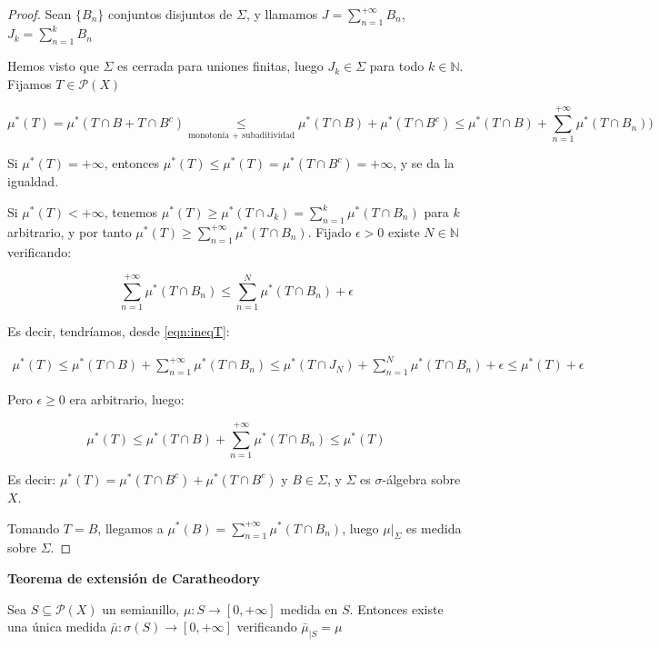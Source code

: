 \begin{proof}
 Sean $\{B_n\}$ conjuntos disjuntos de $\Sigma$, y llamamos $J = \sum_{n=1}^{+\infty} B_n$, $J_k = \sum_{n=1}^{k} B_n$
 
 Hemos visto que $\Sigma$ es cerrada para uniones finitas, luego $J_k \in \Sigma$ para todo $k\in \mathbb{N}$.
 Fijamos $T\in \mathcal{P}(X)$
 
 \begin{equation}
  \mu^\ast(T) = \mu^\ast(T\cap B + T\cap B^c) \underset{\textrm{monotonía + subaditividad}} \le 
  \mu^\ast(T\cap B) + \mu^\ast(T\cap B^c) \le \mu^\ast(T\cap B) + \sum_{n=1}^{+\infty}\mu^\ast(T\cap B_n))
  \label{eqn:ineqT} \tag{*}
 \end{equation}
 
 Si $\mu^\ast(T) = +\infty$, entonces $\mu^\ast(T) \le \mu^\ast(T) = \mu^\ast(T\cap B^c) = +\infty$, y se da
 la igualdad.
 
 Si $\mu^\ast(T) < +\infty$, tenemos $\mu^\ast(T) \ge \mu^\ast(T\cap J_k) = \sum_{n=1}^k \mu^\ast(T\cap B_n)$
 para $k$ arbitrario, y por tanto $\mu^\ast(T) \ge \sum_{n=1}^{+\infty} \mu^\ast(T\cap B_n)$. Fijado $\epsilon > 0$
 existe $N\in \mathbb{N}$ verificando:
 
 \[\sum_{n=1}^{+\infty} \mu^\ast(T\cap B_n) \le \sum_{n=1}^N \mu^\ast(T\cap B_n) + \epsilon\]
 
 Es decir, tendríamos, desde \eqref{eqn:ineqT}:
 
 \begin{align*}
   \mu^\ast(T) \le \mu^\ast(T\cap B) + \sum_{n=1}^{+\infty}\mu^\ast(T\cap B_n) \le 
   \mu^\ast(T\cap J_N) + \sum_{n=1}^{N}\mu^\ast(T\cap B_n) + \epsilon \le  \mu^\ast(T) + \epsilon
 \end{align*}

 Pero $\epsilon \ge 0$ era arbitrario, luego:
 
 \[\mu^\ast(T) \le \mu^\ast(T\cap B) + \sum_{n=1}^{+\infty}\mu^\ast(T\cap B_n) \le \mu^\ast(T)\]
 
 Es decir: $\mu^\ast(T) = \mu^\ast(T\cap B^c) + \mu^\ast(T\cap B^c)$ y $B\in \Sigma$, y $\Sigma$ es $\sigma$-álgebra
 sobre $X$.
 
 Tomando $T=B$, llegamos a $\mu^\ast(B) = \sum_{n=1}^{+\infty}\mu^\ast(T\cap B_n)$, luego $\mu|_{\Sigma}$ es
 medida sobre $\Sigma$.
 
\end{proof}


\begin{theorem} \textbf{Teorema de extensión de Caratheodory}

 Sea $S \subseteq \mathcal{P}(X)$ un semianillo, $\mu:S \rightarrow [0,+\infty]$ medida en $S$. Entonces existe
 una única medida $\bar{\mu}:\sigma(S) \rightarrow [0,+\infty]$ verificando $\bar{\mu}_{|S} = \mu$
\end{theorem}

